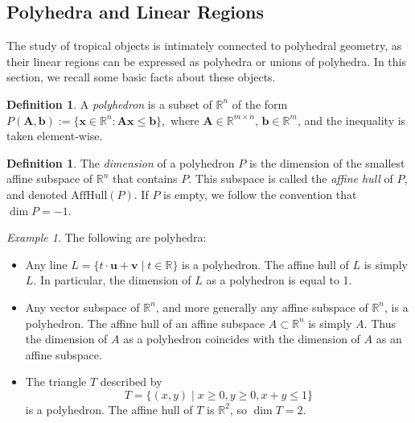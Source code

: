 \documentclass[10pt]{article}
\theoremstyle{definition}
\newtheorem{definition}[theorem]{Definition}
\theoremstyle{remark}
\newtheorem{example}[theorem]{Example}
\newcommand{\RR}{{\mathbb{R}}}
\renewcommand{\vec}[1]{\mathbf{#1}}
\def\vb{{\vec{b}}}
\def\vu{{\bm{u}}}
\def\vv{{\bm{v}}}
\def\vx{{\vec{x}}}
\def\mA{{\bm{A}}}
\begin{document}
\subsection{Polyhedra and Linear Regions} \label{subsec:linear-regions-signomials}
The study of tropical objects is intimately connected to polyhedral geometry, as their linear regions can be expressed as polyhedra or unions of polyhedra. In this section, we recall some basic facts about these objects. 

\begin{definition}
    A \emph{polyhedron} is a subset of $\mathbb{R}^n$ of the form $P(\mA,\vb) := \{\vx\in\mathbb{R}^n:\mA\vx\leq\vb\},$
    where $\mA\in\mathbb{R}^{m\times n}$, $\vb\in\mathbb{R}^m$, and the inequality is taken element-wise.
\end{definition}

\begin{definition}
    The \emph{dimension} of a polyhedron $P$ is the dimension of the smallest affine subspace of $\RR^n$ that contains $P$. This subspace is called the \emph{affine hull} of $P$, and denoted $\mathrm{AffHull}(P).$ If $P$ is empty, we follow the convention that $\dim P = -1$.
\end{definition}

\begin{example} The following are polyhedra:
\begin{itemize}
    \item Any line $L = \{ t \cdot \vu + \vv \mid t \in \RR\}$ is a polyhedron. The affine hull of $L$ is simply $L$. In particular, the dimension of $L$ as a polyhedron is equal to 1.
    \item Any vector subspace of $\RR^n$, and more generally any affine subspace of $\RR^n$, is a polyhedron. The affine hull of an affine subspace $A \subset \RR^n$ is simply $A$. Thus the dimension of $A$ as a polyhedron coincides with the dimension of $A$ as an affine subspace.
    \item The triangle $T$ described by
    $$
        T = \{ (x, y) \mid x \ge 0, y \ge 0, x + y \le 1\}
    $$
    is a polyhedron. The affine hull of $T$ is $\RR^2$, so $\dim T = 2$.
\end{itemize}
\end{example}
\end{document}
